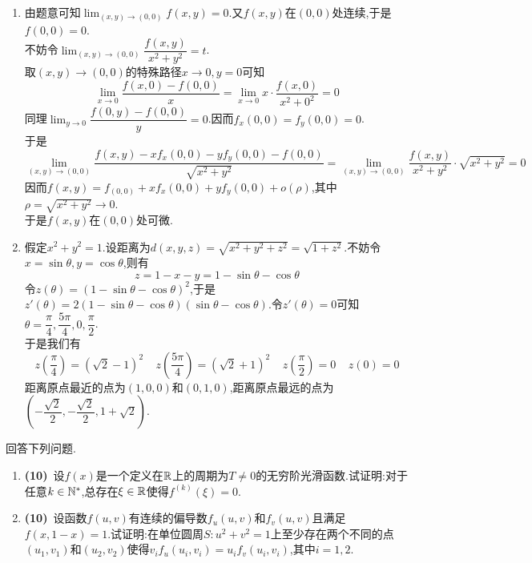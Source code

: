 \documentclass{ctexart}
\begin{document}
\begin{solution}
    \begin{enumerate}[label=\tbf{(\arabic*)}]
        \item 由题意可知$\displaystyle\lim_{(x,y)\to(0,0)}f(x,y)=0$.又$f(x,y)$在$(0,0)$处连续,于是$f(0,0)=0$.\\
            不妨令$\displaystyle\lim_{(x,y)\to(0,0)}\dfrac{f(x,y)}{x^2+y^2}=t$.\\
            取$(x,y)\to(0,0)$的特殊路径$x\to0,y=0$可知
            \[\lim_{x\to0}\dfrac{f(x,0)-f(0,0)}{x}=\lim_{x\to0}x\cdot\dfrac{f(x,0)}{x^2+0^2}=0\]
            同理$\displaystyle\lim_{y\to0}\dfrac{f(0,y)-f(0,0)}{y}=0$.因而$f_x(0,0)=f_y(0,0)=0$.\\
            于是
            \[\lim_{(x,y)\to(0,0)}\dfrac{f(x,y)-xf_x(0,0)-yf_y(0,0)-f(0,0)}{\sqrt{x^2+y^2}}=\lim_{(x,y)\to(0,0)}\dfrac{f(x,y)}{x^2+y^2}\cdot\sqrt{x^2+y^2}=0\]
            因而$f(x,y)=f_(0,0)+xf_x(0,0)+yf_y(0,0)+o(\rho)$,其中$\rho=\sqrt{x^2+y^2}\to0$.\\
            于是$f(x,y)$在$(0,0)$处可微.
        \item 假定$x^2+y^2=1$.设距离为$d(x,y,z)=\sqrt{x^2+y^2+z^2}=\sqrt{1+z^2}$.不妨令$x=\sin\theta,y=\cos\theta$,则有
            \[z=1-x-y=1-\sin\theta-\cos\theta\]
            令$z(\theta)=(1-\sin\theta-\cos\theta)^2$,于是$z'(\theta)=2(1-\sin\theta-\cos\theta)(\sin\theta-\cos\theta)$.令$z'(\theta)=0$可知$\theta=\dfrac\pi4,\dfrac{5\pi}{4},0,\dfrac\pi2$.\\
            于是我们有
            \[z\left(\dfrac\pi4\right)=\left(\sqrt2-1\right)^2\ \ \ \ \ z\left(\dfrac{5\pi}4\right)=\left(\sqrt2+1\right)^2\ \ \ \ \ z\left(\dfrac\pi2\right)=0\ \ \ \ \ z(0)=0\]
            距离原点最近的点为$(1,0,0)$和$(0,1,0)$,距离原点最远的点为$\left(-\dfrac{\sqrt2}{2},-\dfrac{\sqrt2}{2},1+\sqrt2\right)$.
    \end{enumerate}
\end{solution}
\begin{problem}[5.(20\songti{分})]
    回答下列问题.
    \begin{enumerate}[label=\tbf{(\arabic*)}]
        \item \textbf{(10)}\ 设$f(x)$是一个定义在$\mathbb{R}$上的周期为$T\neq0$的无穷阶光滑函数.试证明:对于任意$k\in\mathbb{N}^*$,总存在$\xi\in\mathbb{R}$使得$f^{(k)}(\xi)=0$.
        \item \textbf{(10)}\ 设函数$f(u,v)$有连续的偏导数$f_u(u,v)$和$f_v(u,v)$且满足$f(x,1-x)=1$.试证明:在单位圆周$S:u^2+v^2=1$上至少存在两个不同的点$(u_1,v_1)$和$(u_2,v_2)$使得$v_if_u(u_i,v_i)=u_if_v(u_i,v_i)$,其中$i=1,2$.
    \end{enumerate}
\end{problem}
\end{document}
